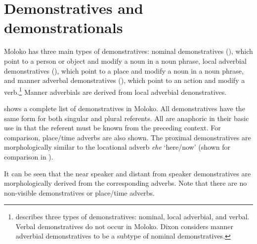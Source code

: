 \section{Demonstratives and demonstrationals}\label{sec:3.2}
\hypertarget{RefHeading1210941525720847}{}
Moloko has three main types of demonstratives: nominal demonstratives (), which point to a person or object and modify a noun in a noun phrase, local adverbial demonstratives (), which point to a place and modify a noun in a noun phrase, and manner adverbal demonstratives (), which point to an action and modify a verb.\footnote{\citet{Dixon2003} describes three types of demonstratives: nominal, local adverbial, and verbal. Verbal demonstratives do not occur in Moloko. Dixon considers manner adverbial demonstratives to be a subtype of nominal demonstratives.} Manner adverbials are derived from local adverbial denonstratives. 

 shows a complete list of demonstratives in Moloko. All demonstratives have the same form for both singular and plural referents.  All are anaphoric in their basic use in that the referent must be known from the preceding context. For comparison, place/time adverbs are also shown. The proximal demonstratives are morphologically similar to the locational adverb \textit{ehe} ‘here/now’ (shown for comparison in ).

It can be seen that the near speaker and distant from speaker demonstratives are morphologically derived from the corresponding adverbs. Note that there are no non-visible demonstratives or place/time adverbs.

